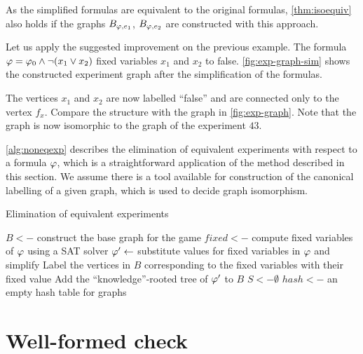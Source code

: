 As the simplified formulas are equivalent to the original formulas,
\autoref{thm:isoequiv} also holds if the graphs $B_{\varphi, e_1}$, $B_{\varphi, e_2}$
are constructed with this approach.

\begin{example}
Let us apply the suggested improvement on the previous example.
The formula $\varphi = \varphi_0\wedge\neg(x_1\vee x_2)$ fixed variables
$x_1$ and $x_2$ to false.
\autoref{fig:exp-graph-sim} shows the constructed experiment graph
  after the simplification of the formulas.

The vertices $x_1$ and $x_2$ are now labelled ``false'' and are connected
  only to the vertex $f_x$.
Compare the structure with the graph in \autoref{fig:exp-graph}.
Note that the graph is now isomorphic to the graph of the experiment $43$.\eqed
\end{example}

\autoref{alg:noneqexp} describes the elimination of equivalent experiments with respect to a formula $\varphi$,
  which is a straightforward application of the method described in this section.
We assume there is a tool available for construction of the canonical labelling
  of a given graph,
  which is used to decide graph isomorphism.

\begin{algorithm}[!ht]
\caption{Elimination of equivalent experiments}
\label{alg:noneqexp}
\DontPrintSemicolon
$B <-$ construct the base graph for the game\;
$fixed <-$ compute fixed variables of $\varphi$ using a SAT solver\;
$\varphi' <- $ substitute values for fixed variables in $\varphi$ and simplify\;
Label the vertices in $B$ corresponding to the fixed variables with their fixed value\;
Add the ``knowledge''-rooted tree of $\varphi'$ to $B$\;
$S <- \emptyset$\;
$hash <- $ an empty hash table for graphs\;
\end{algorithm}

\pagebreak
\section{Well-formed check}

